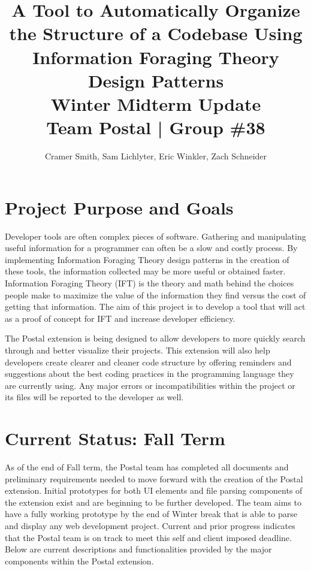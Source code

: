 \documentclass[letterpaper,10pt,titlepage,draftclsnofoot,onecolumn,onesided] {IEEEtran}
\def\doctitle{A Tool to Automatically Organize the Structure of a Codebase Using Information Foraging Theory Design Patterns}
\def\doctype{Progress Report}
\def\doctype{Winter Midterm Update}
\def\team{Team Postal | Group \#38}
\begin{document}
\title{\Huge{\bfseries{\textsf{\doctitle}}}\\\textsf{\Large{\doctype}}\\\textsf{\large{\team}}}
\author{Cramer Smith, Sam Lichlyter, Eric Winkler, Zach Schneider}

\maketitle
\vfill

\vfill

\pagebreak

\tableofcontents


\pagebreak

\section{Project Purpose and Goals}
Developer tools are often complex pieces of software. 
Gathering and manipulating useful information for a programmer can often be a slow and costly process. 
By implementing Information Foraging Theory design patterns in the creation of these tools, the information collected may be more useful or obtained faster. 
Information Foraging Theory (IFT) is the theory and math behind the choices people make to maximize the value of the information they find versus the cost of getting that information.
The aim of this project is to develop a tool that will act as a proof of concept for IFT and increase developer efficiency.

The Postal extension is being designed to allow developers to more quickly search through and better visualize their projects.
This extension will also help developers create clearer and cleaner code structure by offering reminders and suggestions about the best coding practices in the programming language they are currently using.
Any major errors or incompatibilities within the project or its files will be reported to the developer as well.

\section{Current Status: Fall Term}

As of the end of Fall term, the Postal team has completed all documents and preliminary requirements needed to move forward with the creation of the Postal extension. 
Initial prototypes for both UI elements and file parsing components of the extension exist and are beginning to be further developed. 
The team aims to have a fully working prototype by the end of Winter break that is able to parse and display any web development project.
Current and prior progress indicates that the Postal team is on track to meet this self and client imposed deadline.
Below are current descriptions and functionalities provided by the major components within the Postal extension.
\end{document}

